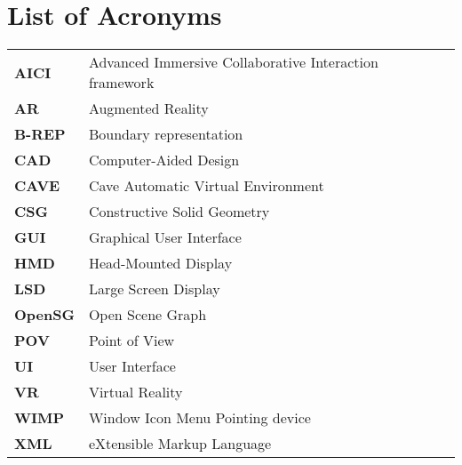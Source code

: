 \chapter*{List of Acronyms}

\begin{tabular}{ll}

\textbf{AICI} & Advanced Immersive Collaborative Interaction framework \\

\textbf{AR} & Augmented Reality \\

\textbf{B-REP} & Boundary representation \\

\textbf{CAD} & Computer-Aided Design \\

\textbf{CAVE} & Cave Automatic Virtual Environment \\

\textbf{CSG} & Constructive Solid Geometry \\

\textbf{GUI} & Graphical User Interface \\

\textbf{HMD} & Head-Mounted Display \\ 

\textbf{LSD} & Large Screen Display \\ 

\textbf{OpenSG} & Open Scene Graph \\



\textbf{POV} & Point of View \\

\textbf{UI} & User Interface \\

\textbf{VR} & Virtual Reality \\

\textbf{WIMP} & Window Icon Menu Pointing device \\

\textbf{XML} & eXtensible Markup Language \\

\end{tabular}
